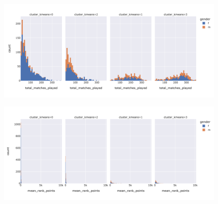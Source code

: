\begin{figure}
\centering
\begin{minipage}{.5\textwidth}
\centering
\includegraphics[width=\textwidth]{plots/kmeans/hist_total_matches.png}
\label{fig:total_match_played_kmeans}
\end{minipage}%
\begin{minipage}{.5\textwidth}
\centering
\includegraphics[width=\textwidth]{plots/kmeans/hist_mean_rank_points.png}
\label{fig:mean_rank_points_kmeans}
\end{minipage}


\end{figure}
